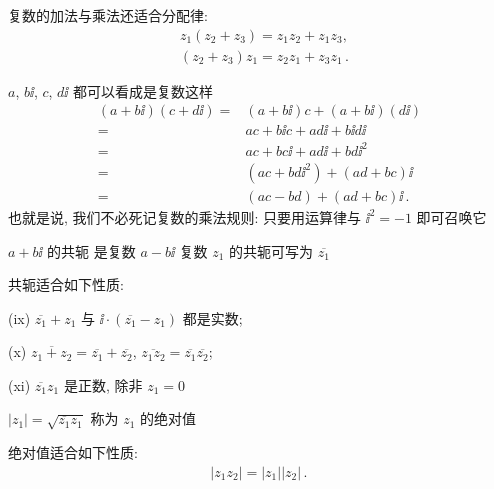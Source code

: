 \begin{proposition}
    复数的加法与乘法还适合分配律:
    \begin{align*}
         & z_1 (z_2 + z_3) = z_1 z_2 + z_1 z_3,       \\
         & (z_2 + z_3) z_1 = z_2 z_1 + z_3 z_1\period
    \end{align*}
\end{proposition}

\begin{remark}
    $a$, $b\ii$, $c$, $d\ii$ 都可以看成是复数\period 这样
    \begin{align*}
        (a + b \ii) (c + d \ii)
        = {} & (a + b \ii) c + (a + b \ii) (d \ii)  \\
        = {} & ac + b \ii c + a d \ii + b \ii d \ii \\
        = {} & ac + bc\ii + ad\ii + bd\ii^2         \\
        = {} & (ac + bd\ii^2) + (ad + bc)\ii        \\
        = {} & (ac - bd) + (ad + bc)\ii \period
    \end{align*}
    也就是说, 我们不必死记复数的乘法规则: 只要用运算律与 $\ii^2 = -1$ 即可召唤它\period
\end{remark}

\begin{definition}
    $a + b\ii$ 的共轭  是复数 $a - b\ii$ \period 复数 $z_1$ 的共轭可写为 $\overline{z_1}$\period
\end{definition}

\begin{proposition}
    共轭适合如下性质:

    (ix) $\overline{z_1} + z_1$ 与 $\ii \cdot (\overline{z_1} - z_1)$ 都是实数;

    (x) $\overline{z_1 + z_2} = \overline{z_1} + \overline{z_2}$, $\overline{z_1 z_2} = \overline{z_1} \overline{z_2}$;

    (xi) $\overline{z_1} z_1$ 是正数, 除非 $z_1 = 0$\period
\end{proposition}

\begin{definition}
    $|z_1| = \sqrt{\overline{z_1} z_1}$ 称为 $z_1$ 的绝对值 \period
\end{definition}

\begin{proposition}
    绝对值适合如下性质:
    \begin{align*}
        |z_1 z_2| = |z_1| |z_2| \period
    \end{align*}
\end{proposition}

